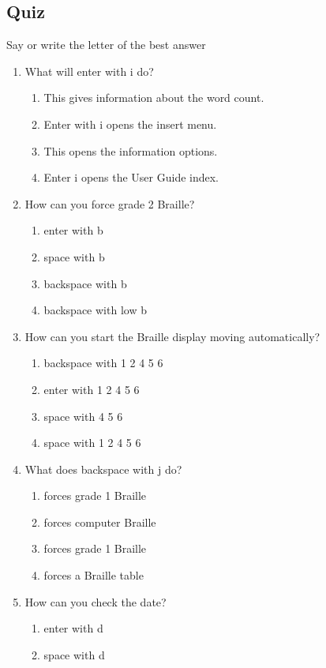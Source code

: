 \documentclass[10pt,letterpaper,twoside]{report}
\begin{document}
{{{\subsection{Quiz}
Say or write the letter of the best answer
\begin{enumerate}
	\item What will enter with i do?
	      \begin{enumerate}
		      \item This gives information about the word count.
		      \item Enter with i opens the insert menu.
		      \item This opens the information options.
		      \item Enter i opens the User Guide index.
	      \end{enumerate}
	\item How can you force grade 2 Braille?
	      \begin{enumerate}
		      \item enter with b
		      \item space with b
		      \item backspace with b
		      \item backspace with low b
	      \end{enumerate}
	\item How can you start the Braille display moving automatically?
	      \begin{enumerate}
		      \item backspace with 1 2 4 5 6
		      \item enter with 1 2 4 5 6
		      \item space with 4 5 6
		      \item space with 1 2 4 5 6
	      \end{enumerate}
	\item What does backspace with j do?
	      \begin{enumerate}
		      \item forces grade 1 Braille
		      \item forces computer Braille
		      \item forces grade 1 Braille
		      \item forces a Braille table
	      \end{enumerate}
	\item How can you check the date?
	      \begin{enumerate}
		      \item enter with d
		      \item space with d

\end{enumerate}
\end{enumerate}}}}
\end{document}

